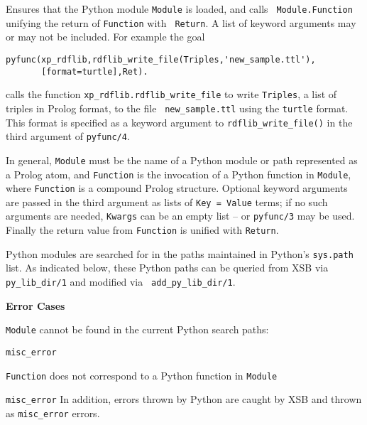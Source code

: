 \begin{description}

%
 Ensures that the Python module {\tt Module} is loaded, and calls {\tt
   Module.Function} unifying the return of {\tt Function} with {\tt
   Return}.  A list of keyword arguments may or may not be included.
 For example the goal

\begin{verbatim}
pyfunc(xp_rdflib,rdflib_write_file(Triples,'new_sample.ttl'),
       [format=turtle],Ret).
\end{verbatim}

calls the function {\tt xp\_rdflib.rdflib\_write\_file} to write
{\tt Triples}, a list of triples in Prolog format, to the file {\tt
  new\_sample.ttl} using the {\tt turtle} format.  This format is
specified as a keyword argument to {\tt rdflib\_write\_file()} in the
third argument of {\tt pyfunc/4}.

In general, {\tt Module} must be the name of a Python module or path
represented as a Prolog atom, and {\tt Function} is the invocation of
a Python function in {\tt Module}, where {\tt Function} is a compound
Prolog structure.  Optional keyword arguments are passed in the third
argument as lists of {\tt Key = Value} terms; if no such arguments are
needed, {\tt Kwargs} can be an empty list -- or {\tt pyfunc/3} may be
used.  Finally the return value from {\tt Function} is unified with
{\tt Return}.

Python modules are searched for in the paths maintained in Python's
{\tt sys.path} list.  As indicated below, these Python paths can be
queried from XSB via {\tt py\_lib\_dir/1} and modified via {\tt
  add\_py\_lib\_dir/1}.
     
{\bf Error Cases}
\bi
\item {\tt Module} cannot be found in the current Python search paths:
\bi
\item {\tt misc\_error}
\ei
\item {\tt Function} does not correspond to a Python function in {\tt Module}
\bi
\item {\tt misc\_error}
  \ei \ei
%
  In addition, errors thrown by Python are
  caught by XSB and thrown as {\tt misc\_error} errors.


\end{description}
